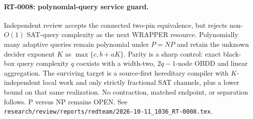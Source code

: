 \paragraph{RT-0008: polynomial-query service guard.}
Independent review accepts the connected two-pin equivalence, but rejects
non-$O(1)$ SAT-query complexity as the next WRAPPER resource.  Polynomially
many adaptive queries remain polynomial under $P=NP$ and retain the unknown
decider exponent $K$ as $\max\{c,b+aK\}$.  Parity is a sharp control: exact
black-box query complexity $q$ coexists with a width-two, $2q-1$-node OBDD
and linear aggregation.  The surviving target is a source-first hereditary
compiler with $K$-independent local work and only strictly fractional SAT
channels, plus a lower bound on that same realization.  No contraction,
matched endpoint, or separation follows.  P versus NP remains OPEN.  See
\texttt{research/review/reports/redteam/2026-10-11\_1036\_RT-0008.tex}.
